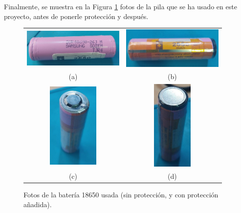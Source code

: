 \documentclass[12pt]{article}
\begin{document}
	\noindent Finalmente, se muestra en la Figura \ref{18650 con y sin proteccion} fotos de la pila que se ha usado en este proyecto, antes de ponerle protección y después.
	
	\begin{figure}[h!]
		\begin{center}
			\begin{tabular}{cc}
				\includegraphics[width=50mm]{img/18650_sinProteccion.jpg} &   \includegraphics[width=50mm]{img/18650_conProteccion_1.jpg} \\
				(a) & (b) \\[6pt]
				\includegraphics[width=25mm]{img/18650_conProteccion_2.jpg} &   \includegraphics[width=20mm]{img/18650_conProteccion_3.jpg} \\
				(c)  & (d)  \\[6pt]
			\end{tabular}
			\caption{Fotos de la batería 18650 usada (sin protección, y con protección añadida).}
			\label{18650 con y sin proteccion}
		\end{center}
	\end{figure}
	
\end{document}
